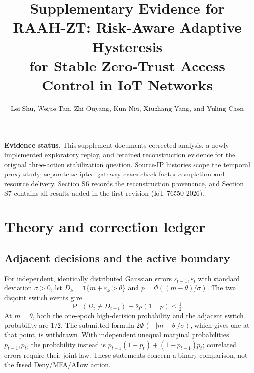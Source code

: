 \documentclass[10pt,onecolumn]{IEEEtran}
\begin{document}
\title{Supplementary Evidence for\\
RAAH-ZT: Risk-Aware Adaptive Hysteresis\\
for Stable Zero-Trust Access Control in IoT Networks}
\author{Lei Shu, Weijie Tan, Zhi Ouyang, Kun Niu, Xiuzhang Yang, and Yuling Chen}
\maketitle

\noindent\textbf{Evidence status.}
This supplement documents corrected analysis, a newly implemented
exploratory replay, and retained reconstruction evidence for the
original three-action stabilization question. Source-IP histories
scope the temporal proxy study; separate scripted gateway cases
check factor completion and resource delivery. Section S6 records
the reconstruction provenance, and Section S7 contains all results added in the
first revision (IoT-76550-2026).

\section{Theory and correction ledger}
\label{sec:supp_theory}

\subsection{Adjacent decisions and the active boundary}
For independent, identically distributed Gaussian errors
\(\varepsilon_{t-1},\varepsilon_t\) with standard deviation
\(\sigma>0\), let \(D_k=\mathbf1\{m+\varepsilon_k>\theta\}\) and
\(p=\Phi((m-\theta)/\sigma)\). The two disjoint switch events give
\[
 \Pr(D_t\ne D_{t-1})=2p(1-p)\le\tfrac12 .
\]
At \(m=\theta\), both the one-epoch high-decision probability
and the adjacent switch probability are \(1/2\). The submitted
formula \(2\Phi(-|m-\theta|/\sigma)\), which gives one at that
point, is withdrawn. With independent unequal marginal
probabilities \(p_{t-1},p_t\), the probability instead is
\(p_{t-1}(1-p_t)+(1-p_{t-1})p_t\); correlated errors require
their joint law. These statements concern a binary comparison,
not the fused Deny/MFA/Allow action.
\end{document}
